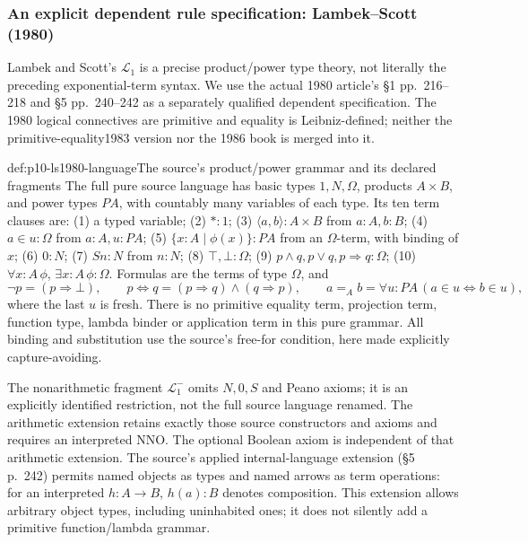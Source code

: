 \subsubsection{An explicit dependent rule specification: Lambek--Scott (1980)}
\label{sec:p10-ls1980-dependent-calculus}

Lambek and Scott's \(\mathcal L_1\) is a precise product/power type theory,
not literally the preceding exponential-term syntax. We use the actual
1980 article's \S1 pp.~216--218 and \S5 pp.~240--242
\cite{LambekScott1980ITT} as a separately qualified dependent specification.
The 1980 logical connectives are primitive and equality is Leibniz-defined;
neither the primitive-equality1983 version nor the 1986 book is merged into it.

\begin{hbdefinition}{def:p10-ls1980-language}{The source's product/power grammar and its declared fragments}
The full pure source language has basic types \(1,N,\Omega\), products
\(A\times B\), and power types \(PA\), with countably many variables of each
type. Its ten term clauses are: (1) a typed variable; (2) \(*:1\);
(3) \(\langle a,b\rangle:A\times B\) from \(a:A,b:B\);
(4) \(a\in u:\Omega\) from \(a:A,u:PA\);
(5) \(\{x:A\mid\phi(x)\}:PA\) from an \(\Omega\)-term, with binding of \(x\);
(6) \(0:N\); (7) \(Sn:N\) from \(n:N\);
(8) \(\top,\bot:\Omega\); (9) \(p\wedge q,p\vee q,p\Rightarrow q:\Omega\);
(10) \(\forall x:A\,\phi\), \(\exists x:A\,\phi:\Omega\).
Formulas are the terms of type \(\Omega\), and
\[
 \neg p=(p\Rightarrow\bot),\qquad
 p\Leftrightarrow q=(p\Rightarrow q)\wedge(q\Rightarrow p),\qquad
 a=_Ab=\forall u:PA\,(a\in u\Leftrightarrow b\in u),
\]
where the last \(u\) is fresh. There is no primitive equality term,
projection term, function type, lambda binder or application term in this
pure grammar. All binding and substitution use the source's free-for
condition, here made explicitly capture-avoiding.

The nonarithmetic fragment \(\mathcal L_1^-\) omits \(N,0,S\) and Peano
axioms; it is an explicitly identified restriction, not the full source
language renamed. The arithmetic extension retains exactly those source
constructors and axioms and requires an interpreted NNO. The optional
Boolean axiom is independent of that arithmetic extension.
The source's applied internal-language extension (\S5 p.~242) permits named
objects as types and named arrows as term operations: for an interpreted
\(h:A\to B\), \(h(a):B\) denotes composition. This extension allows arbitrary
object types, including uninhabited ones; it does not silently add a
primitive function/lambda grammar.
\end{hbdefinition}

